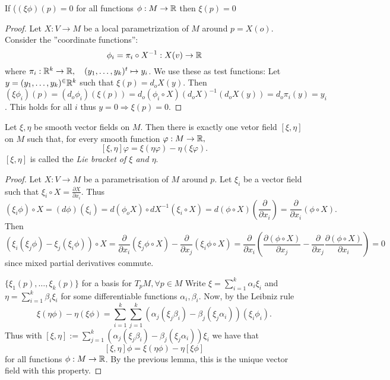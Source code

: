 \begin{lemma}
	If ($ (\xi\phi)(p) = 0 $ for all functions $ \phi: M \rightarrow\mathbb R $ then $ \xi(p) = 0 $
\end{lemma}
\begin{proof}
	
	Let $ X : V \rightarrow M $ be a local parametrization of $ M $ around $ p = X(o) $.
	Consider the ''coordinate functions'':
		\[ \phi_i = \pi_i \circ X^{-1}: X(v) \rightarrow \mathbb R \]
	where $ \pi_i:\mathbb R^k \rightarrow \mathbb R, \quad (y_1, \dots, y_k)^t \mapsto y_i $.
	We use these as test functions: Let  $ y = (y_1, \dots, y_k)^ \in \mathbb R^k $ such that $ \xi(p) = d_oX(y). $ Then $ (\xi\phi_i)(p) = (d_o\phi_i)(\xi(p))= d_o(\phi_i \circ X)(d_oX)^{-1}(d_oX(y)) = d_o\pi_i(y) = y_i $. This holds for all $ i $ thus $ y = 0 \Rightarrow \xi(p) = 0 $.
	
\end{proof}

\begin{lemma, definition}
	
	Let $ \xi, \eta $ be smooth vector fields on $ M $. Then there is exactly one vetor field $ [\xi,\eta] $ on $ M $ such that, for every smooth function $ \varphi:M \rightarrow \mathbb R, $
		\[ [\xi,\eta]\varphi = \xi(\eta\varphi)-\eta(\xi\varphi). \]
	$ [\xi,\eta] $ is called the \emph{Lie bracket of $ \xi $ and $ \eta $}.
	
\end{lemma, definition}

\begin{proof}
	
	Let $ X: V \rightarrow M $ be a parametrisation of $ M $ around $ p $. Let $ \xi_i $ be a vector field such that $ \xi_i \circ X = \frac{\partial X}{\partial x_i}. $ Thus 
		\[ (\xi_i \phi) \circ X = (d\phi)(\xi_i) = d(\phi_oX) \circ dX^{-1}(\xi_i \circ X) = d(\phi \circ X)(\frac{\partial}{\partial x_i}) = \frac{\partial}{\partial x_i}(\phi \circ X). \]
	 Then
	 	\[ (\xi_i(\xi_j \phi) - \xi_j(\xi_i \phi)) \circ X = \frac{\partial}{\partial x_i}(\xi_j\phi \circ X) - \frac{\partial}{\partial x_j}(\xi_i\phi \circ X) = \frac{\partial}{\partial x_i}(\frac{\partial(\phi \circ X)}{\partial x_j} - \frac{\partial}{\partial x_j}\frac{\partial(\phi \circ X)}{\partial x_i}) = 0 \]
	since mixed partial derivatives commute.
	
	$ \{ \xi_1(p), \dots, \xi_k(p) \} $ for a basis for $ T_pM, \forall p \in M $ Write $ \xi = \sum_{i =1}^{k} \alpha_i \xi_i $ and $ \eta = \sum_{i=1}^{k}\beta_i \xi_i $ for some differentiable functions $ \alpha_i,\beta_i $. Now, by the Leibniz rule
		\[ \xi(\eta \phi) - \eta(\xi \phi) = \sum_{i =1}^{k} \sum_{j =1}^{k} (\alpha_j ( \xi_j \beta_i) - \beta_j(\xi_j\alpha_i))(\xi_i\phi_i). \]
	Thus with $ [\xi,\eta] := \sum_{j =1}^{k} (\alpha_j ( \xi_j \beta_i) - \beta_j(\xi_j\alpha_i))\xi_i $ we have that 
		\[ [\xi,\eta]\phi = \xi(\eta\phi)-\eta[\xi\phi] \] for all functions $ \phi: M \rightarrow \mathbb R $. By the previous lemma, this is the unique vector field with this property.
\end{proof}

